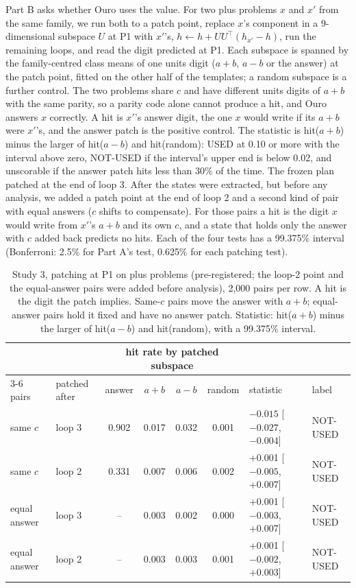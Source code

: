 \documentclass{article}
\begin{document}
Part B asks whether Ouro uses the value. For two plus problems $x$ and $x'$ from the same family, we run both to a patch point, replace $x$'s component in a 9-dimensional subspace $U$ at P1 with $x'$'s, $h \leftarrow h + UU^\top(h_{x'} - h)$, run the remaining loops, and read the digit predicted at P1. Each subspace is spanned by the family-centred class means of one units digit ($a+b$, $a-b$ or the answer) at the patch point, fitted on the other half of the templates; a random subspace is a further control. The two problems share $c$ and have different units digits of $a+b$ with the same parity, so a parity code alone cannot produce a hit, and Ouro answers $x$ correctly. A hit is $x'$'s answer digit, the one $x$ would write if its $a+b$ were $x'$'s, and the answer patch is the positive control. The statistic is hit($a+b$) minus the larger of hit($a-b$) and hit(random): USED at 0.10 or more with the interval above zero, NOT-USED if the interval's upper end is below 0.02, and unscorable if the answer patch hits less than 30\% of the time. The frozen plan patched at the end of loop 3. After the states were extracted, but before any analysis, we added a patch point at the end of loop 2 and a second kind of pair with equal answers ($c$ shifts to compensate). For those pairs a hit is the digit $x$ would write from $x'$'s $a+b$ and its own $c$, and a state that holds only the answer with $c$ added back predicts no hits. Each of the four tests has a 99.375\% interval (Bonferroni: 2.5\% for Part A's test, 0.625\% for each patching test).

\begin{table}[t]
\centering
\caption{Study 3, patching at P1 on plus problems (pre-registered; the loop-2 point and the equal-answer pairs were added before analysis), 2,000 pairs per row. A hit is the digit the patch implies. Same-$c$ pairs move the answer with $a+b$; equal-answer pairs hold it fixed and have no answer patch. Statistic: hit($a+b$) minus the larger of hit($a-b$) and hit(random), with a 99.375\% interval.}
\label{tab:patch}
\small
\begin{tabular}{@{}llccccll@{}}
\toprule
 & & \multicolumn{4}{c}{hit rate by patched subspace} & & \\
\cmidrule(lr){3-6}
pairs & patched after & answer & $a+b$ & $a-b$ & random & statistic & label \\
\midrule
same $c$ & loop 3 & 0.902 & 0.017 & 0.032 & 0.001 & $-0.015$ [$-0.027$, $-0.004$] & NOT-USED \\
same $c$ & loop 2 & 0.331 & 0.007 & 0.006 & 0.002 & +0.001 [$-0.005$, +0.007] & NOT-USED \\
equal answer & loop 3 & -- & 0.003 & 0.002 & 0.000 & +0.001 [$-0.003$, +0.007] & NOT-USED \\
equal answer & loop 2 & -- & 0.003 & 0.003 & 0.001 & +0.001 [$-0.002$, +0.003] & NOT-USED \\
\bottomrule
\end{tabular}
\end{table}
\end{document}

